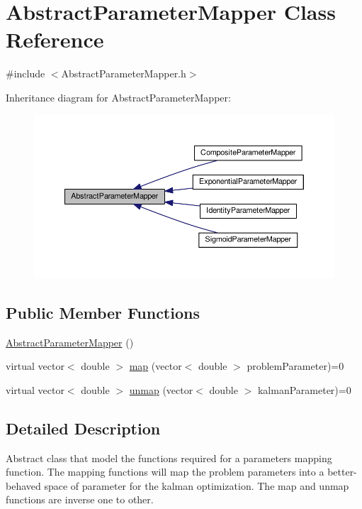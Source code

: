 \hypertarget{classAbstractParameterMapper}{}\section{Abstract\+Parameter\+Mapper Class Reference}
\label{classAbstractParameterMapper}


{\ttfamily \#include $<$Abstract\+Parameter\+Mapper.\+h$>$}



Inheritance diagram for Abstract\+Parameter\+Mapper\+:\nopagebreak
\begin{figure}[H]
\begin{center}
\leavevmode
\includegraphics[width=350pt]{classAbstractParameterMapper__inherit__graph}
\end{center}
\end{figure}
\subsection*{Public Member Functions}
\begin{DoxyCompactItemize}
\item 
\mbox{\hyperlink{classAbstractParameterMapper_ae8e7c815952e44d47bc406f396fdf0d6}{Abstract\+Parameter\+Mapper}} ()
\item 
virtual vector$<$ double $>$ \mbox{\hyperlink{classAbstractParameterMapper_abb9e78545ff023f2b786b759ec2d23e4}{map}} (vector$<$ double $>$ problem\+Parameter)=0
\item 
virtual vector$<$ double $>$ \mbox{\hyperlink{classAbstractParameterMapper_a7fc9715759582e218a3bc38ec43e2d57}{unmap}} (vector$<$ double $>$ kalman\+Parameter)=0
\end{DoxyCompactItemize}


\subsection{Detailed Description}
Abstract class that model the functions required for a parameters mapping function. The mapping functions will map the problem parameters into a better-\/behaved space of parameter for the kalman optimization. The map and unmap functions are inverse one to other. 

